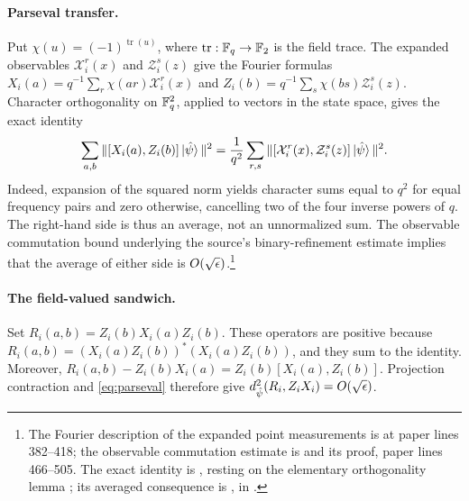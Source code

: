 \documentclass[11pt]{article}
\begin{document}
\paragraph{Parseval transfer.}
Put $\chi(u)=(-1)^{\operatorname{tr}(u)}$, where
$\operatorname{tr}:\mathbb{F}_q\to\mathbb{F}_2$ is the field trace.  The expanded observables
$\mathcal X_i^r(x)$ and $\mathcal Z_i^s(z)$ give the Fourier formulas
$X_i(a)=q^{-1}\sum_r\chi(ar)\mathcal X_i^r(x)$ and
$Z_i(b)=q^{-1}\sum_s\chi(bs)\mathcal Z_i^s(z)$.
Character orthogonality on $\mathbb{F}_q^2$, applied to vectors in the state space,
gives the exact identity
\begin{equation}\label{eq:parseval}
 \sum_{a,b}\|[X_i(a),Z_i(b)]\ket{\hat\psi}\|^2
 =\frac{1}{q^2}\sum_{r,s}
    \|[\mathcal X_i^r(x),\mathcal Z_i^s(z)]\ket{\hat\psi}\|^2.
\end{equation}
Indeed, expansion of the squared norm yields character sums equal to
$q^2$ for equal frequency pairs and zero otherwise, cancelling two of the
four inverse powers of $q$.  The right-hand side is thus an average, not
an unnormalized sum.  The observable commutation bound underlying the
source's binary-refinement estimate implies that the average of either side
is $O(\sqrt{\epsilon})$.\footnote{The Fourier description of the expanded point
measurements is at paper lines 382--418; the observable commutation estimate
is  and its proof, paper lines 466--505.  The exact
identity is , resting on the
elementary orthogonality lemma ;
its averaged consequence is , in
.}

\paragraph{The field-valued sandwich.}
Set $R_i(a,b)=Z_i(b)X_i(a)Z_i(b)$.  These operators are positive because
$R_i(a,b)=(X_i(a)Z_i(b))^*(X_i(a)Z_i(b))$, and they sum to the identity.
Moreover,
$R_i(a,b)-Z_i(b)X_i(a)=Z_i(b)[X_i(a),Z_i(b)]$.
Projection contraction and \eqref{eq:parseval} therefore give
$d_{\hat\psi}^2(R_i,Z_iX_i)=O(\sqrt{\epsilon})$.
\end{document}
